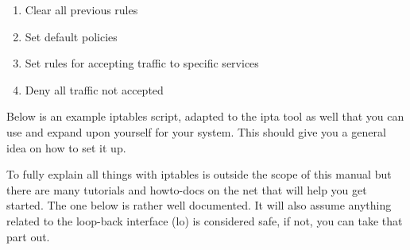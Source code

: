 \documentclass[english,twoside,openright,a4paper,12pt]{article}
\begin{document}
\begin{enumerate}
\item Clear all previous rules
\item Set default policies
\item Set rules for accepting traffic to specific services
\item Deny all traffic not accepted
\end{enumerate}


Below is an example iptables script, adapted to the ipta tool as well
that you can use and expand upon yourself for your system. This should
give you a general idea on how to set it up.

To fully explain all things with iptables is outside the scope of this
manual but there are many tutorials and howto-docs on the net that
will help you get started. The one below is rather well documented. It
will also assume anything related to the loop-back interface (lo) is
considered safe, if not, you can take that part out.

\small
\end{document}
